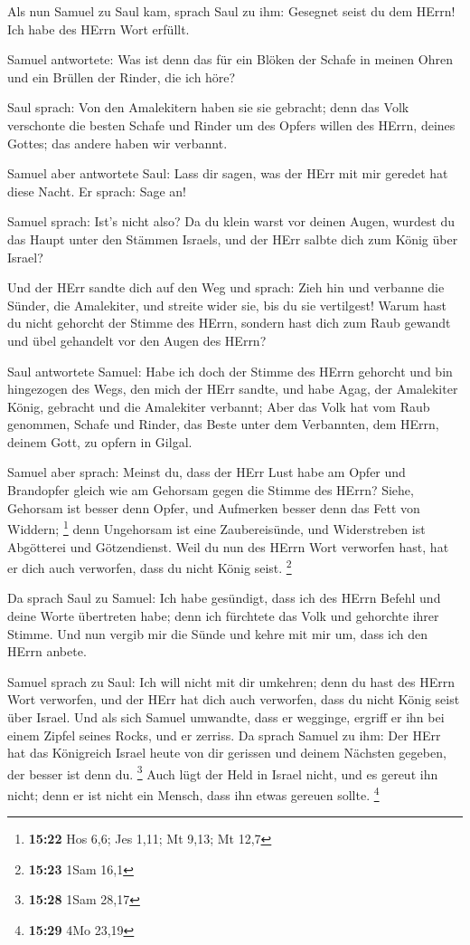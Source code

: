  Als nun Samuel zu Saul kam, sprach Saul zu ihm: Gesegnet
seist du dem HErrn! Ich habe des HErrn Wort erfüllt.

 Samuel antwortete: Was ist denn das für ein Blöken der
Schafe in meinen Ohren und ein Brüllen der Rinder, die ich höre?

 Saul sprach: Von den Amalekitern haben sie sie gebracht;
denn das Volk verschonte die besten Schafe und Rinder um des Opfers
willen des HErrn, deines Gottes; das andere haben wir verbannt.

 Samuel aber antwortete Saul: Lass dir sagen, was der HErr
mit mir geredet hat diese Nacht. Er sprach: Sage an!

 Samuel sprach: Ist's nicht also? Da du klein warst vor
deinen Augen, wurdest du das Haupt unter den Stämmen Israels, und der
HErr salbte dich zum König über Israel?

 Und der HErr sandte dich auf den Weg und sprach: Zieh hin
und verbanne die Sünder, die Amalekiter, und streite wider sie, bis du
sie vertilgest!  Warum hast du nicht gehorcht der Stimme
des HErrn, sondern hast dich zum Raub gewandt und übel gehandelt vor den
Augen des HErrn?

 Saul antwortete Samuel: Habe ich doch der Stimme des HErrn
gehorcht und bin hingezogen des Wegs, den mich der HErr sandte, und habe
Agag, der Amalekiter König, gebracht und die Amalekiter verbannt;
 Aber das Volk hat vom Raub genommen, Schafe und Rinder,
das Beste unter dem Verbannten, dem HErrn, deinem Gott, zu opfern in
Gilgal.

 Samuel aber sprach: Meinst du, dass der HErr Lust habe am
Opfer und Brandopfer gleich wie am Gehorsam gegen die Stimme des HErrn?
Siehe, Gehorsam ist besser denn Opfer, und Aufmerken besser denn das
Fett von Widdern; \footnote{\textbf{15:22} Hos 6,6; Jes 1,11; Mt 9,13;
  Mt 12,7}  denn Ungehorsam ist eine Zaubereisünde, und
Widerstreben ist Abgötterei und Götzendienst. Weil du nun des HErrn Wort
verworfen hast, hat er dich auch verworfen, dass du nicht König seist.
\footnote{\textbf{15:23} 1Sam 16,1}

 Da sprach Saul zu Samuel: Ich habe gesündigt, dass ich des
HErrn Befehl und deine Worte übertreten habe; denn ich fürchtete das
Volk und gehorchte ihrer Stimme.  Und nun vergib mir die
Sünde und kehre mit mir um, dass ich den HErrn anbete.

 Samuel sprach zu Saul: Ich will nicht mit dir umkehren;
denn du hast des HErrn Wort verworfen, und der HErr hat dich auch
verworfen, dass du nicht König seist über Israel.  Und als
sich Samuel umwandte, dass er wegginge, ergriff er ihn bei einem Zipfel
seines Rocks, und er zerriss.  Da sprach Samuel zu ihm: Der
HErr hat das Königreich Israel heute von dir gerissen und deinem
Nächsten gegeben, der besser ist denn du. \footnote{\textbf{15:28} 1Sam
  28,17}  Auch lügt der Held in Israel nicht, und es gereut
ihn nicht; denn er ist nicht ein Mensch, dass ihn etwas gereuen sollte.
\footnote{\textbf{15:29} 4Mo 23,19}


